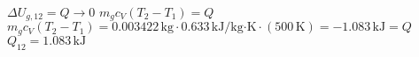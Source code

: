 \( \Delta U_{g,12} = Q \rightarrow 0 \)  
\( m_g c_V (T_2 - T_1) = Q \)  
\( m_g c_V (T_2 - T_1) = 0.003422 \, \text{kg} \cdot 0.633 \, \text{kJ/kg·K} \cdot (500 \, \text{K}) = -1.083 \, \text{kJ} = Q \)  
\( Q_{12} = 1.083 \, \text{kJ} \)